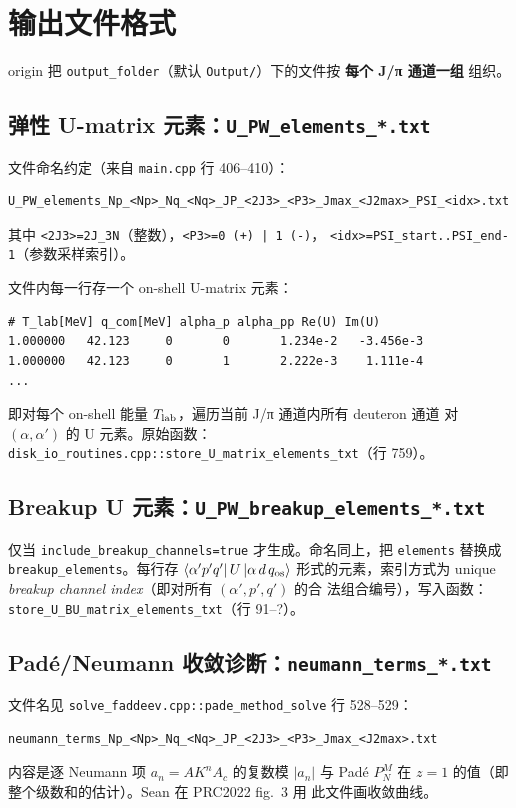 \section{输出文件格式}
\label{sec:ch18-output}

origin 把 \texttt{output\_folder}（默认 \texttt{Output/}）下的文件按
\textbf{每个 J/π 通道一组} 组织。

\subsection{弹性 U-matrix 元素：\texttt{U\_PW\_elements\_*.txt}}

文件命名约定（来自 \texttt{main.cpp} 行 406--410）：
\begin{lstlisting}[style=config]
U_PW_elements_Np_<Np>_Nq_<Nq>_JP_<2J3>_<P3>_Jmax_<J2max>_PSI_<idx>.txt
\end{lstlisting}
其中 \texttt{<2J3>=2J\_3N}（整数），\texttt{<P3>=0 (+) | 1 (-)}，
\texttt{<idx>=PSI\_start..PSI\_end-1}（参数采样索引）。

文件内每一行存一个 on-shell U-matrix 元素：
\begin{lstlisting}[style=config]
# T_lab[MeV] q_com[MeV] alpha_p alpha_pp Re(U) Im(U)
1.000000   42.123     0       0       1.234e-2   -3.456e-3
1.000000   42.123     0       1       2.222e-3    1.111e-4
...
\end{lstlisting}
即对每个 on-shell 能量 ${T_{\text{lab}}}$，遍历当前 J/π 通道内所有 deuteron 通道
对 $(\alpha, \alpha')$ 的 U 元素。原始函数：
\texttt{disk\_io\_routines.cpp::store\_U\_matrix\_elements\_txt}（行 759）。

\subsection{Breakup U 元素：\texttt{U\_PW\_breakup\_elements\_*.txt}}

仅当 \texttt{include\_breakup\_channels=true} 才生成。命名同上，把
\texttt{elements} 替换成 \texttt{breakup\_elements}。每行存
$\bra{\alpha' p' q'}U\ket{\alpha\,d\,q_{\rm os}}$ 形式的元素，索引方式为
unique \emph{breakup channel index}（即对所有 $(\alpha', p', q')$ 的合
法组合编号），写入函数：
\texttt{store\_U\_BU\_matrix\_elements\_txt}（行 91--?）。

\subsection{Padé/Neumann 收敛诊断：\texttt{neumann\_terms\_*.txt}}

文件名见 \texttt{solve\_faddeev.cpp::pade\_method\_solve} 行 528--529：
\begin{lstlisting}[style=config]
neumann_terms_Np_<Np>_Nq_<Nq>_JP_<2J3>_<P3>_Jmax_<J2max>.txt
\end{lstlisting}
内容是逐 Neumann 项 $a_n = A K^n A_c$ 的复数模 $|a_n|$ 与 Padé
$P_N^M$ 在 $z=1$ 的值（即整个级数和的估计）。Sean 在 PRC2022 fig.~3 用
此文件画收敛曲线。


